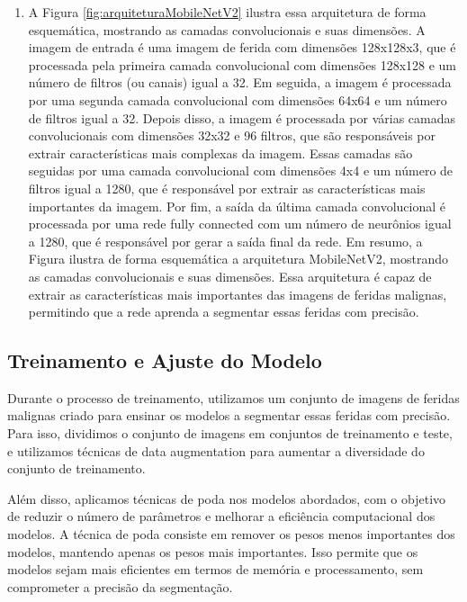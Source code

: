     
            \begin{enumerate}
                \item A Figura \ref{fig:arquiteturaMobileNetV2} ilustra essa arquitetura de forma esquemática, mostrando as camadas convolucionais e suas dimensões. A imagem de entrada é uma imagem de ferida com dimensões 128x128x3, que é processada pela primeira camada convolucional com dimensões 128x128 e um número de filtros (ou canais) igual a 32. Em seguida, a imagem é processada por uma segunda camada convolucional com dimensões 64x64 e um número de filtros igual a 32. Depois disso, a imagem é processada por várias camadas convolucionais com dimensões 32x32 e 96 filtros, que são responsáveis por extrair características mais complexas da imagem. Essas camadas são seguidas por uma camada convolucional com dimensões 4x4 e um número de filtros igual a 1280, que é responsável por extrair as características mais importantes da imagem. Por fim, a saída da última camada convolucional é processada por uma rede fully connected com um número de neurônios igual a 1280, que é responsável por gerar a saída final da rede.
                Em resumo, a Figura ilustra de forma esquemática a arquitetura \ac{MobileNetV2}, mostrando as camadas convolucionais e suas dimensões. Essa arquitetura é capaz de extrair as características mais importantes das imagens de feridas malignas, permitindo que a rede aprenda a segmentar essas feridas com precisão. 
            \end{enumerate}

\subsection{Treinamento e Ajuste do Modelo}
    Durante o processo de treinamento, utilizamos um conjunto de imagens de feridas malignas criado para ensinar os modelos a segmentar essas feridas com precisão. Para isso, dividimos o conjunto de imagens em conjuntos de treinamento e teste, e utilizamos técnicas de data augmentation para aumentar a diversidade do conjunto de treinamento.

    Além disso, aplicamos técnicas de poda nos modelos abordados, com o objetivo de reduzir o número de parâmetros e melhorar a eficiência computacional dos modelos. A técnica de poda consiste em remover os pesos menos importantes dos modelos, mantendo apenas os pesos mais importantes. Isso permite que os modelos sejam mais eficientes em termos de memória e processamento, sem comprometer a precisão da segmentação.

